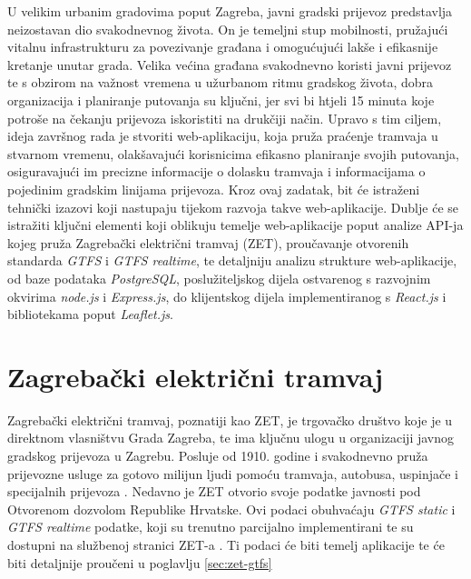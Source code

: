 \documentclass[zavrsnirad]{fer}
\begin{document}
U velikim urbanim gradovima poput Zagreba, javni gradski prijevoz predstavlja neizostavan dio svakodnevnog života. On je temeljni stup mobilnosti, pružajući vitalnu infrastrukturu za povezivanje građana i omogućujući lakše i efikasnije kretanje unutar grada. Velika većina građana svakodnevno koristi javni prijevoz te s obzirom na važnost vremena u užurbanom ritmu gradskog života, dobra organizacija i planiranje putovanja su ključni, jer svi bi htjeli 15 minuta koje potroše na čekanju prijevoza iskoristiti na drukčiji način. Upravo s tim ciljem, ideja završnog rada je stvoriti web-aplikaciju, koja pruža praćenje tramvaja u stvarnom vremenu, olakšavajući korisnicima efikasno planiranje svojih putovanja, osiguravajući im precizne informacije o dolasku tramvaja i informacijama o pojedinim gradskim linijama prijevoza. Kroz ovaj zadatak, bit će istraženi tehnički izazovi koji nastupaju tijekom razvoja takve web-aplikacije. Dublje će se istražiti ključni elementi koji oblikuju temelje web-aplikacije poput analize API-ja kojeg pruža Zagrebački električni tramvaj (ZET), proučavanje otvorenih standarda \textit{GTFS} i \textit{GTFS realtime}, te detaljniju analizu strukture web-aplikacije, od baze podataka \textit{PostgreSQL}, poslužiteljskog dijela ostvarenog s razvojnim okvirima \textit{node.js} i \textit{Express.js}, do klijentskog dijela implementiranog s \textit{React.js} i bibliotekama poput \textit{Leaflet.js}.







\chapter{Zagrebački električni tramvaj}
Zagrebački električni tramvaj, poznatiji kao ZET, je trgovačko društvo koje je u direktnom
vlasništvu Grada Zagreba, te ima ključnu ulogu u organizaciji javnog gradskog prijevoza u Zagrebu.
Posluje od 1910. godine i svakodnevno pruža prijevozne usluge za gotovo milijun ljudi pomoću
tramvaja, autobusa, uspinjače i specijalnih prijevoza \cite{ZET}.
Nedavno je ZET otvorio svoje podatke javnosti pod Otvorenom dozvolom Republike Hrvatske. Ovi podaci obuhvaćaju \textit{GTFS static} i \textit{GTFS realtime} podatke, koji su trenutno parcijalno implementirani te su dostupni na službenoj stranici ZET-a \cite{ZET-GTFS}.
Ti podaci će biti temelj aplikacije te će biti detaljnije proučeni u poglavlju \ref{sec:zet-gtfs}
\\\\
\end{document}
